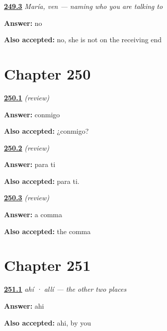 \noindent\begin{minipage}[t]{\linewidth}
\raggedright
\hyperlink{review-ES-C64-maria-ven-noa}{\textbf{249.3}} \emph{María, ven — naming who you are talking to}\par
\small \textbf{Answer:} no\par
\footnotesize \textbf{Also accepted:} no, she is not on the receiving end
\end{minipage}\par\medskip

\section*{Chapter 250}

\noindent\begin{minipage}[t]{\linewidth}
\raggedright
\hyperlink{review-ES-C64-repaso-tonicos-with}{\textbf{250.1}} \emph{(review)}\par
\small \textbf{Answer:} conmigo\par
\footnotesize \textbf{Also accepted:} ¿conmigo?
\end{minipage}\par\medskip

\noindent\begin{minipage}[t]{\linewidth}
\raggedright
\hyperlink{review-ES-C64-repaso-tonicos-for}{\textbf{250.2}} \emph{(review)}\par
\small \textbf{Answer:} para ti\par
\footnotesize \textbf{Also accepted:} para ti.
\end{minipage}\par\medskip

\noindent\begin{minipage}[t]{\linewidth}
\raggedright
\hyperlink{review-ES-C64-repaso-tonicos-comma}{\textbf{250.3}} \emph{(review)}\par
\small \textbf{Answer:} a comma\par
\footnotesize \textbf{Also accepted:} the comma
\end{minipage}\par\medskip

\section*{Chapter 251}

\noindent\begin{minipage}[t]{\linewidth}
\raggedright
\hyperlink{review-ES-C65-ahi-alli-yours}{\textbf{251.1}} \emph{ahí · allí — the other two places}\par
\small \textbf{Answer:} ahi\par
\footnotesize \textbf{Also accepted:} ahi, by you
\end{minipage}\par\medskip

